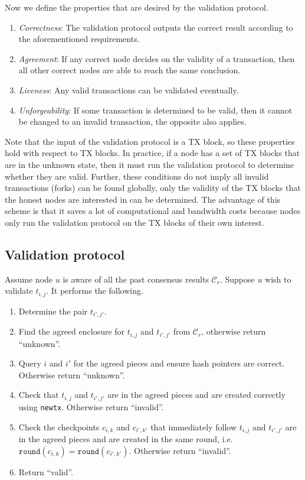 Now we define the properties that are desired by the validation protocol.
\begin{enumerate}
\item \emph{Correctness}: The validation protocol outputs the correct result
  according to the aforementioned requirements.
\item \emph{Agreement}: If any correct node decides on the validity of a 
  transaction, then all other correct nodes are able to reach the same
  conclusion.
\item \emph{Liveness}: Any valid transactions can be validated eventually.
\item \emph{Unforgeability}: If some transaction is determined to be valid, then
  it cannot be changed to an invalid transaction, the opposite also applies.
\end{enumerate}

Note that the input of the validation protocol is a TX block, so these
properties hold with respect to TX blocks. In practice, if a node has a set of
TX blocks that are in the unknown state, then it must run the validation
protocol to determine whether they are valid. Further, these conditions do not
imply all invalid transactions (forks) can be found globally, only the validity
of the TX blocks that the honest nodes are interested in can be determined. The
advantage of this scheme is that it saves a lot of computational and bandwidth
costs because nodes only run the validation protocol on the TX blocks of their
own interest.

\subsection{Validation protocol}
Assume node $u$ is aware of all the past consensus results $\mathcal{C}_r$.
Suppose $u$ wish to validate $t_{i,j}$. It performs the following.

\begin{enumerate}
\item Determine the pair $t_{i', j'}$.
\item Find the agreed enclosure for $t_{i,j}$ and $t_{i', j'}$ from
  $\mathcal{C}_r$, otherwise return ``unknown''.
\item Query $i$ and $i'$ for the agreed pieces and ensure hash pointers are
  correct. Otherwise return ``unknown''.
\item Check that $t_{i,j}$ and $t_{i', j'}$ are in the agreed pieces and are
  created correctly using \texttt{newtx}. Otherwise return ``invalid''.
\item Check the checkpoints $c_{i, k}$ and $c_{i', k'}$ that immediately follow
  $t_{i,j}$ and $t_{i', j'}$ are in the agreed pieces and are created in the
  same round, i.e. $\texttt{round}(c_{i, k}) = \texttt{round}(c_{i', k'})$.
  Otherwise return ``invalid''.
\item Return ``valid''.
\end{enumerate}

